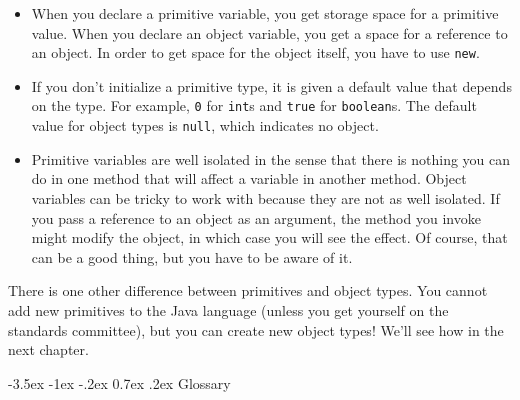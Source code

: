 \documentclass{book}
\makeatletter
\renewcommand{\section}{\@startsection 
    {section} {1} {0mm}%
    {-3.5ex \@plus -1ex \@minus -.2ex}%
    {0.7ex \@plus.2ex}%
    {\normalfont\Large\bfseries}}
\makeatother
\begin{document}
\begin{itemize}

\item When you declare a primitive variable, you get storage
space for a primitive value.  When you declare an object variable, you
get a space for a reference to an object.  In order to get space for
the object itself, you have to use {\tt new}.

\item If you don't initialize a primitive type, it is given
a default value that depends on the type.  For example,
{\tt 0} for {\tt int}s and {\tt true} for {\tt boolean}s.
The default value for object types is {\tt null}, which indicates
no object.

\item Primitive variables are well isolated in the sense that there is
nothing you can do in one method that will affect a variable in
another method.  Object variables can be tricky to work with because
they are not as well isolated.  If you pass a reference to an object
as an argument, the method you invoke might modify the object, in which
case you will see the effect.  Of course, that can be a good thing, but you
have to be aware of it.

\end{itemize}

There is one other difference between primitives and object
types.  You cannot add new primitives to the Java language
(unless you get yourself on the standards committee), but
you can create new object types!  We'll see how in the next
chapter.

\section{Glossary}
\end{document}
